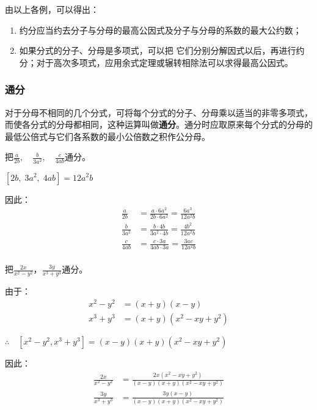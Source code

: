 由以上各例，可以得出：
\begin{enumerate}
    \item 约分应当约去分子与分母的最高公因式及分子与分母的系数的最大公约数；
    \item 如果分式的分子、分母是多项式，可以把
它们分别分解因式以后，再进行约分；对于高次多项式，应用余式定理或辗转相除法可以求得最高公因式。
\end{enumerate} 

\subsubsection{通分}

对于分母不相同的几个分式，可将每个分式的分子、分母乘以适当的非零多项式，而使各分式的分母都相同，这种运算叫做\textbf{通分}。通分时应取原来每个分式的分母的最低公倍式与它们各系数的最小公倍数之积作公分母。

\begin{example}
    把$\frac{a}{2b},\quad \frac{b}{3a^2},\quad \frac{c}{4ab}$通分。
\end{example}

\begin{solution}
$[2b,\; 3a^2,\; 4ab]=12a^2b$

因此：
\[\begin{split}
    \frac{a}{2b}&=\frac{a\cdot 6a^2}{2b\cdot 6a^2}=\frac{6a^3}{12a^2b}\\
    \frac{b}{3a^2}&=\frac{b\cdot 4b}{3a^2\cdot 4b}=\frac{4b^2}{12a^2b}\\
     \frac{c}{4ab}&=\frac{c\cdot 3a}{4ab\cdot 3a}=\frac{3ac}{12a^2b}\\
\end{split}\]
\end{solution}

\begin{example}
    把$\frac{2x}{x^2-y^2}$，$\frac{3y}{x^3+y^3}$通分。
\end{example}

\begin{solution}
    由于：
    \[\begin{split}
        x^2-y^2&=(x+y)(x-y)\\
        x^3+y^3&=(x+y)(x^2-xy+y^2)
    \end{split}\]

$\therefore\quad [x^2-y^2, x^3+y^3]=(x-y)(x+y)(x^2-xy+y^2)$    

因此：
\[\begin{split}
    \frac{2x}{x^2-y^2}&=\frac{2x(x^2-xy+y^2)}{(x-y)(x+y)(x^2-xy+y^2)}\\
    \frac{3y}{x^3+y^3}&=\frac{3y(x-y)}{(x-y)(x+y)(x^2-xy+y^2)}
\end{split}\]
\end{solution}

